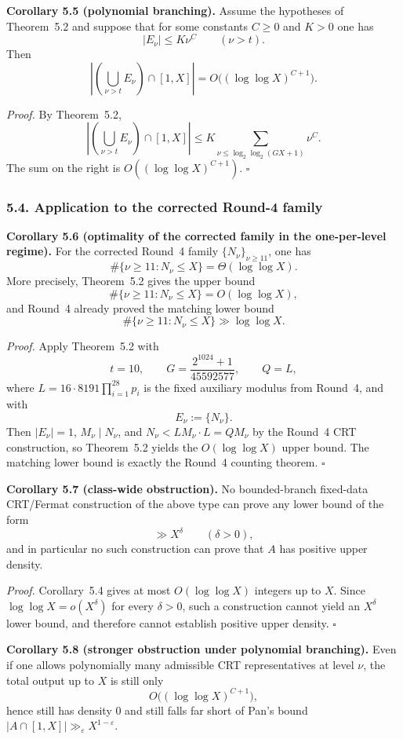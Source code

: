 \medskip
\noindent\textbf{Corollary 5.5 (polynomial branching).}
Assume the hypotheses of Theorem~5.2 and suppose that for some constants $C\ge 0$ and $K>0$ one has
\[
|E_\nu|\le K\nu^C\qquad (\nu>t).
\]
Then
\[
\left|\left(\bigcup_{\nu>t}E_\nu\right)\cap [1,X]\right|
=
O\!\big((\log\log X)^{C+1}\big).
\]

\medskip
\noindent\emph{Proof.}
By Theorem~5.2,
\[
\left|\left(\bigcup_{\nu>t}E_\nu\right)\cap [1,X]\right|
\le
K\sum_{\nu\le \log_2\log_2(GX+1)} \nu^C.
\]
The sum on the right is $O((\log\log X)^{C+1})$. \hfill$\square$

\subsubsection*{5.4. Application to the corrected Round-4 family}

\noindent\textbf{Corollary 5.6 (optimality of the corrected family in the one-per-level regime).}
For the corrected Round~4 family $\{N_\nu\}_{\nu\ge 11}$, one has
\[
\#\{\nu\ge 11:N_\nu\le X\}
=
\Theta(\log\log X).
\]
More precisely, Theorem~5.2 gives the upper bound
\[
\#\{\nu\ge 11:N_\nu\le X\}=O(\log\log X),
\]
and Round~4 already proved the matching lower bound
\[
\#\{\nu\ge 11:N_\nu\le X\}\gg \log\log X.
\]

\medskip
\noindent\emph{Proof.}
Apply Theorem~5.2 with
\[
t=10,\qquad G=\frac{2^{1024}+1}{45592577},\qquad Q=L,
\]
where $L=16\cdot 8191\prod_{i=1}^{28}p_i$ is the fixed auxiliary modulus from Round~4, and with
\[
E_\nu:=\{N_\nu\}.
\]
Then $|E_\nu|=1$, $M_\nu\mid N_\nu$, and $N_\nu<LM_\nu\cdot L=QM_\nu$ by the Round~4 CRT construction, so Theorem~5.2 yields the $O(\log\log X)$ upper bound.
The matching lower bound is exactly the Round~4 counting theorem. \hfill$\square$

\medskip
\noindent\textbf{Corollary 5.7 (class-wide obstruction).}
No bounded-branch fixed-data CRT/Fermat construction of the above type can prove any lower bound of the form
\[
\gg X^\delta\qquad (\delta>0),
\]
and in particular no such construction can prove that $A$ has positive upper density.

\medskip
\noindent\emph{Proof.}
Corollary~5.4 gives at most $O(\log\log X)$ integers up to $X$.
Since $\log\log X=o(X^\delta)$ for every $\delta>0$, such a construction cannot yield an $X^\delta$ lower bound, and therefore cannot establish positive upper density. \hfill$\square$

\medskip
\noindent\textbf{Corollary 5.8 (stronger obstruction under polynomial branching).}
Even if one allows polynomially many admissible CRT representatives at level $\nu$, the total output up to $X$ is still only
\[
O\!\big((\log\log X)^{C+1}\big),
\]
hence still has density $0$ and still falls far short of Pan's bound $|A\cap[1,X]|\gg_\varepsilon X^{1-\varepsilon}$.

